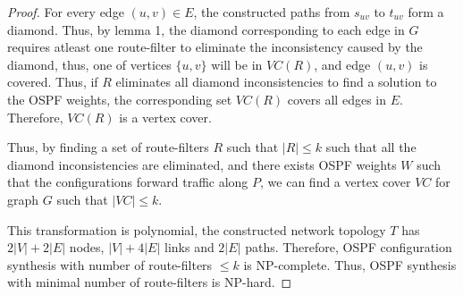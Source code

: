 \begin{proof}
For every edge $(u,v) \in E$, the constructed paths from 
$s_{uv}$ to $t_{uv}$ form a diamond. Thus, by lemma 1, 
the diamond corresponding to each edge in $G$ 
requires atleast one route-filter to eliminate
the inconsistency caused by the diamond, thus, one 
of vertices $\{u,v\}$ will be in $VC(R)$, and edge $(u,v)$
is covered. Thus, if $R$ eliminates all diamond inconsistencies
to find a solution to the OSPF weights, the corresponding set
$VC(R)$ covers all edges in $E$. Therefore, $VC(R)$ is a vertex
cover. 

Thus, by finding a set of route-filters $R$ such that $|R| \leq k$
such that all the diamond inconsistencies are eliminated, and there
exists OSPF weights $W$ such that the configurations forward traffic
along $P$, we can find a vertex cover $VC$ for graph $G$ such that
$|VC| \leq k$. 

This transformation is polynomial, the constructed 
network topology $T$ has $2|V| + 2|E|$ nodes, 
$|V| + 4|E|$ links and $2|E|$ paths. Therefore, OSPF
configuration synthesis with number of route-filters $\leq k$ is
NP-complete. Thus, OSPF synthesis with minimal number of 
route-filters is NP-hard. 
\end{proof}